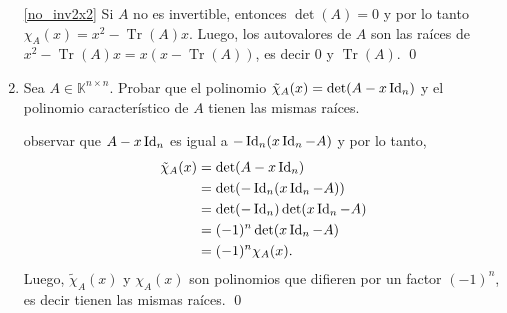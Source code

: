 \begin{enumerate}[resume,topsep=6pt,itemsep=.4cm]
    \ref{no_inv2x2} Si $A$ no es invertible, entonces $\det(A)=0$ y por lo tanto $\chi_A(x) = x^2-\operatorname{Tr}(A)x$. Luego, los autovalores de $A$ son las raíces de $x^2-\operatorname{Tr}(A)x = x(x-\operatorname{Tr}(A))$, es decir $0$ y $\operatorname{Tr}(A)$. \qed


    
        
        
    \item Sea $A\in\mathbb{K}^{n\times n}$. Probar que el polinomio $\tilde\chi_A(x)=\det(A-x\operatorname{Id}_n)$ y el polinomio característico de $A$ tienen las mismas raíces.
    
    \rta observar que $A-x\operatorname{Id}_n$ es igual a $-\operatorname{Id}_n(x\operatorname{Id}_n-A)$ y por lo tanto,
    \begin{align*}
        \tilde\chi_A(x) &= \det(A-x\operatorname{Id}_n) \\
        &= \det(-\operatorname{Id}_n(x\operatorname{Id}_n-A)) \\
        &= \det(-\operatorname{Id}_n)\det(x\operatorname{Id}_n-A) \\
        &= (-1)^n\det(x\operatorname{Id}_n-A) \\
        &= (-1)^n\chi_A(x).
    \end{align*}
    Luego, $\tilde\chi_A(x)$ y $\chi_A(x)$ son polinomios que difieren por un factor $(-1)^n$, es decir tienen las mismas raíces. \qed

    
    \end{enumerate}
    
